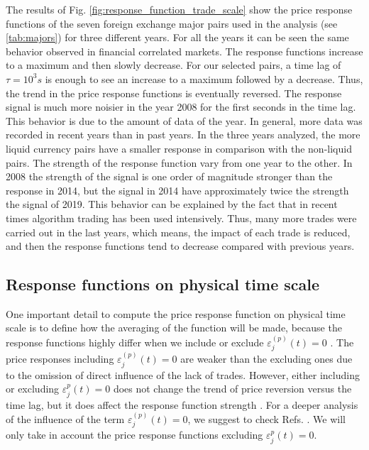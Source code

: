 The results of Fig. \ref{fig:response_function_trade_scale} show the
price response functions of the seven foreign exchange major pairs used in the
analysis (see \ref{tab:majors}) for three different years. For all the years it
can be seen the same behavior observed in financial correlated markets. The
response functions increase to a maximum and then slowly decrease. For our
selected pairs, a time lag of $\tau = 10^{3}s$ is enough to see an increase to
a maximum followed by a decrease. Thus, the trend in the price response
functions is eventually reversed. The response signal is much more noisier in
the year 2008 for the first seconds in the time lag. This behavior is due to
the amount of data of the year. In general, more data was recorded in recent
years than in past years. In the three years analyzed, the more liquid currency
pairs have a smaller response in comparison with the non-liquid pairs. The
strength of the response function vary from one year to the other. In 2008 the
strength of the signal is one order of magnitude stronger than the response in
2014, but the signal in 2014 have approximately twice the strength the signal
of 2019. This behavior can be explained by the fact that in recent times
algorithm trading has been used intensively. Thus, many more trades were
carried out in the last years, which means, the impact of each trade is
reduced, and then the response functions tend to decrease compared with
previous years.

\subsection{Response functions on physical time scale}
\label{subsec:response_function_physical}

One important detail to compute the price response function on physical time
scale is to define how the averaging of the function will be made, because the
response functions highly differ when we include or exclude
$\varepsilon^{\left(p\right)}_j \left( t\right) = 0$ \cite{Wang_2016_cross}.
The price responses including
$\varepsilon^{\left(p\right)}_j \left( t\right) = 0$ are weaker than the
excluding ones due to the omission of direct influence of the lack of trades.
However, either including or excluding $\varepsilon^{p}_j \left( t\right) = 0$
does not change the trend of price reversion versus the time lag, but it does
affect the response function strength \cite{Wang_2016_avg}. For a deeper
analysis of the influence of the term
$\varepsilon^{\left(p\right)}_j \left( t\right) = 0$, we suggest to check Refs.
\cite{Wang_2016_avg,Wang_2016_cross}. We will only take in account the price
response functions excluding $\varepsilon^{p}_j \left( t\right) = 0$.

